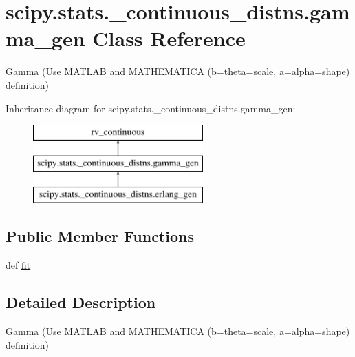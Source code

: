 \hypertarget{classscipy_1_1stats_1_1__continuous__distns_1_1gamma__gen}{}\section{scipy.\+stats.\+\_\+continuous\+\_\+distns.\+gamma\+\_\+gen Class Reference}
\label{classscipy_1_1stats_1_1__continuous__distns_1_1gamma__gen}


Gamma (Use M\+A\+T\+L\+A\+B and M\+A\+T\+H\+E\+M\+A\+T\+I\+C\+A (b=theta=scale, a=alpha=shape) definition)  


Inheritance diagram for scipy.\+stats.\+\_\+continuous\+\_\+distns.\+gamma\+\_\+gen\+:\begin{figure}[H]
\begin{center}
\leavevmode
\includegraphics[height=3.000000cm]{classscipy_1_1stats_1_1__continuous__distns_1_1gamma__gen}
\end{center}
\end{figure}
\subsection*{Public Member Functions}
\begin{DoxyCompactItemize}
\item 
def \hyperlink{classscipy_1_1stats_1_1__continuous__distns_1_1gamma__gen_ada4cf7c9ae70dd241de49f318e88d37d}{fit}
\end{DoxyCompactItemize}


\subsection{Detailed Description}
Gamma (Use M\+A\+T\+L\+A\+B and M\+A\+T\+H\+E\+M\+A\+T\+I\+C\+A (b=theta=scale, a=alpha=shape) definition) 

